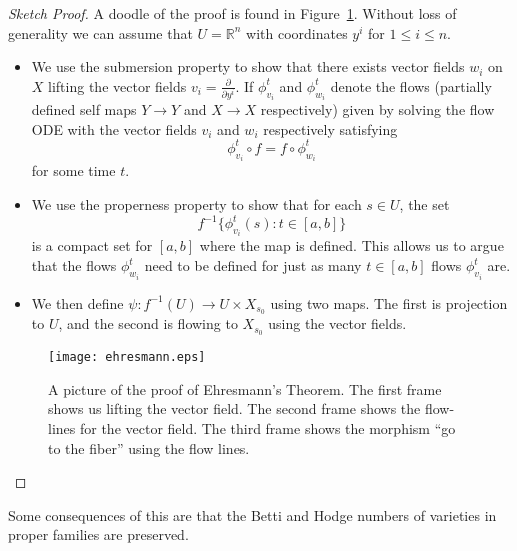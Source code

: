 \documentclass[12pt]{book}
\numberwithin{equation}{section}
\theoremstyle{definition}
\theoremstyle{remark}
\newcommand{\RR}{\mathbb{R}}
\begin{document}
\begin{proof}[Sketch Proof]
	A doodle of the proof is found in Figure~\ref{F:ehresmann}.
	Without loss of generality we can assume that $U = \RR^n$ with coordinates $y^i$ for $1\leq i \leq n$. 
	\begin{itemize}
		\item We use the submersion property to show that there exists vector fields $w_i$ on $X$ lifting the vector fields $v_i =\frac{\partial}{\partial y^i}$.
		If $\phi_{v_i}^t$ and $\phi_{w_i}^t$ denote the flows (partially defined self maps $Y\to Y$ and $X\to X$ respectively) given by solving the flow ODE with the vector fields $v_i$ and $w_i$ respectively satisfying 
		$$ \phi_{v_i}^t \circ f = f \circ \phi_{w_i}^t $$
		for some time $t$. 
		\item We use the properness property to show that for each $s\in U$, the set 
		$$f^{-1}\lbrace \phi^t_{v_i}(s) \colon t\in [a,b] \rbrace$$ is a compact set for $[a,b]$ where the map is defined.
		This allows us to argue that the flows $\phi^t_{w_i}$ need to be defined for just as many $t\in [a,b]$ flows $\phi^t_{v_i}$ are. 
		\item We then define $\psi\colon f^{-1}(U) \to U\times X_{s_0}$ using two maps. 
		The first is projection to $U$, and the second is flowing to $X_{s_0}$ using the vector fields. 
	\end{itemize}
	
	\begin{figure}
		\begin{center}
			\texttt{[image: ehresmann.eps]}
		\end{center}
		\caption{A picture of the proof of Ehresmann's Theorem. 
			The first frame shows us lifting the vector field. 
			The second frame shows the flow-lines for the vector field. 
			The third frame shows the morphism ``go to the fiber'' using the flow lines.}\label{F:ehresmann}
	\end{figure}
\end{proof}


Some consequences of this are that the Betti and Hodge numbers of varieties in proper families are preserved.
\end{document}

